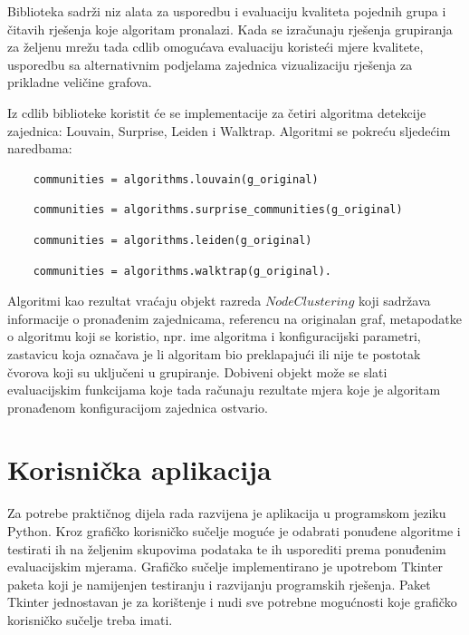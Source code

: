 \documentclass[times, utf8, diplomski]{fer}
\begin{document}
Biblioteka sadrži niz alata za usporedbu i evaluaciju kvaliteta pojednih grupa i čitavih rješenja koje algoritam pronalazi. Kada se izračunaju rješenja grupiranja za željenu mrežu tada cdlib omogućava evaluaciju koristeći mjere kvalitete, usporedbu sa alternativnim podjelama zajednica vizualizaciju rješenja za prikladne veličine grafova.

Iz cdlib biblioteke koristit će se implementacije za četiri algoritma detekcije zajednica: Louvain, Surprise, Leiden i Walktrap. Algoritmi se pokreću sljedećim naredbama:

\begin{verbatim}
	communities = algorithms.louvain(g_original)
\end{verbatim}


\begin{verbatim}
	communities = algorithms.surprise_communities(g_original)
\end{verbatim}

\begin{verbatim}
	communities = algorithms.leiden(g_original)
\end{verbatim}

\begin{verbatim}
	communities = algorithms.walktrap(g_original).
\end{verbatim}


Algoritmi kao rezultat vraćaju objekt razreda $NodeClustering$ koji sadržava informacije o pronađenim zajednicama, referencu na originalan graf, metapodatke o algoritmu koji se koristio, npr. ime algoritma i konfiguracijski parametri, zastavicu koja označava je li algoritam bio preklapajući ili nije te postotak čvorova koji su uključeni u grupiranje. Dobiveni objekt može se slati evaluacijskim funkcijama koje tada računaju rezultate mjera koje je algoritam pronađenom konfiguracijom zajednica ostvario.


\section{Korisnička aplikacija}

Za potrebe praktičnog dijela rada razvijena je aplikacija u programskom jeziku Python. Kroz grafičko korisničko sučelje moguće je odabrati ponuđene algoritme i testirati ih na željenim skupovima podataka te ih usporediti prema ponuđenim evaluacijskim mjerama. Grafičko sučelje implementirano je upotrebom Tkinter paketa koji je namijenjen testiranju i razvijanju programskih rješenja. Paket Tkinter jednostavan je za korištenje i nudi sve potrebne mogućnosti koje grafičko korisničko sučelje treba imati.
\end{document}
